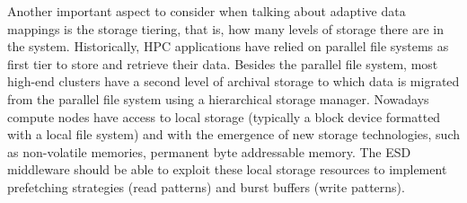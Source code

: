 Another important aspect to consider when talking about adaptive data mappings is the storage tiering, that is, how many levels of storage there are in the system. Historically, HPC applications have relied on parallel file systems as first tier to store and retrieve their data. Besides the parallel file system, most high-end clusters have a second level of archival storage to which data is migrated from the parallel file system using a hierarchical storage manager. Nowadays compute nodes have access to local storage (typically a block device formatted with a local file system) and with the emergence of new storage technologies, such as non-volatile memories, permanent byte addressable memory. The ESD middleware should be able to exploit these local storage resources to implement prefetching strategies (read patterns) and burst buffers (write patterns).




